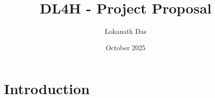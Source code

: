 \documentclass{article}
\title{DL4H - Project Proposal}
\author{Lokanath Das}
\date{October 2025}
\begin{document}
\maketitle

\section{Introduction}
\end{document}
